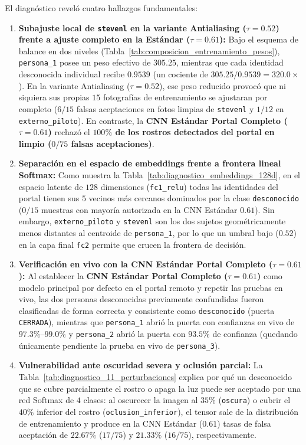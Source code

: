 \documentclass{article}
\begin{document}
El diagnóstico reveló cuatro hallazgos fundamentales:
\begin{enumerate}
    \item \textbf{Subajuste local de \texttt{stevenl} en la variante Antialiasing ($\tau = 0.52$) frente a ajuste completo en la Estándar ($\tau = 0.61$):} Bajo el esquema de balance en dos niveles (Tabla~\ref{tab:composicion_entrenamiento_pesos}), \texttt{persona\_1} posee un peso efectivo de $305.25$, mientras que cada identidad desconocida individual recibe $0.9539$ (un cociente de $305.25 / 0.9539 = 320.0\times$). En la variante Antialiasing ($\tau = 0.52$), ese peso reducido provocó que ni siquiera sus propias $15$ fotografías de entrenamiento se ajustaran por completo ($6/15$ falsas aceptaciones en fotos limpias de \texttt{stevenl} y $1/12$ en \texttt{externo\_piloto}). En contraste, la \textbf{CNN Estándar Portal Completo ($\tau = 0.61$)} rechazó el \textbf{$100\%$ de los rostros detectados del portal en limpio ($0/75$ falsas aceptaciones)}.
    \item \textbf{Separación en el espacio de embeddings frente a frontera lineal Softmax:} Como muestra la Tabla~\ref{tab:diagnostico_embeddings_128d}, en el espacio latente de $128$ dimensiones (\texttt{fc1\_relu}) todas las identidades del portal tienen sus $5$ vecinos más cercanos dominados por la clase \texttt{desconocido} ($0/15$ muestras con mayoría autorizada en la CNN Estándar $0.61$). Sin embargo, \texttt{externo\_piloto} y \texttt{stevenl} son los dos sujetos geométricamente menos distantes al centroide de \texttt{persona\_1}, por lo que un umbral bajo ($0.52$) en la capa final \texttt{fc2} permite que crucen la frontera de decisión.
    \item \textbf{Verificación en vivo con la CNN Estándar Portal Completo ($\tau = 0.61$):} Al establecer la \textbf{CNN Estándar Portal Completo ($\tau = 0.61$)} como modelo principal por defecto en el portal remoto y repetir las pruebas en vivo, las dos personas desconocidas previamente confundidas fueron clasificadas de forma correcta y consistente como \texttt{desconocido} (puerta \texttt{CERRADA}), mientras que \texttt{persona\_1} abrió la puerta con confianzas en vivo de $97.3\%\text{--}99.0\%$ y \texttt{persona\_2} abrió la puerta con $93.5\%$ de confianza (quedando únicamente pendiente la prueba en vivo de \texttt{persona\_3}).
    \item \textbf{Vulnerabilidad ante oscuridad severa y oclusión parcial:} La Tabla~\ref{tab:diagnostico_11_perturbaciones} explica por qué un desconocido que se cubre parcialmente el rostro o apaga la luz puede ser aceptado por una red Softmax de $4$ clases: al oscurecer la imagen al $35\%$ (\texttt{oscura}) o cubrir el $40\%$ inferior del rostro (\texttt{oclusion\_inferior}), el tensor sale de la distribución de entrenamiento y produce en la CNN Estándar ($0.61$) tasas de falsa aceptación de $22.67\%$ ($17/75$) y $21.33\%$ ($16/75$), respectivamente.
\end{enumerate}
\end{document}
